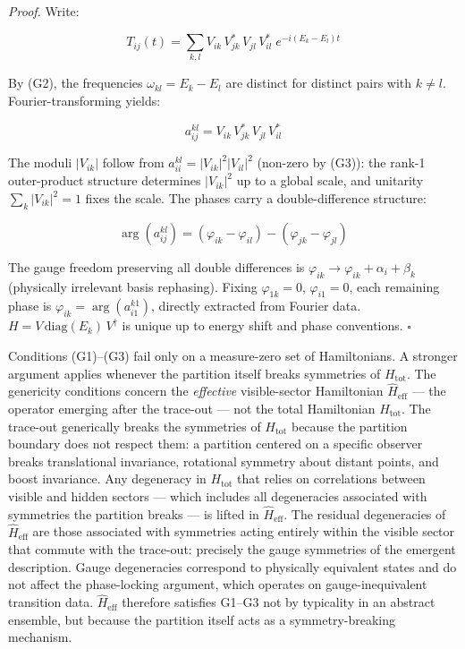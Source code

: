 \documentclass[
]{article}
\begin{document}
\emph{Proof.} Write:

\[T_{ij}(t) = \sum_{k,l} V_{ik}\, V_{jk}^*\, V_{jl}\, V_{il}^*\; e^{-i(E_k - E_l)t}\]

By (G2), the frequencies \(\omega_{kl} = E_k - E_l\) are distinct for
distinct pairs with \(k \neq l\). Fourier-transforming yields:

\[a_{ij}^{kl} = V_{ik}\, V_{jk}^*\, V_{jl}\, V_{il}^*\]

The moduli \(|V_{ik}|\) follow from
\(a_{ii}^{kl} = |V_{ik}|^2 |V_{il}|^2\) (non-zero by (G3)): the rank-1
outer-product structure determines \(|V_{ik}|^2\) up to a global scale,
and unitarity \(\sum_k |V_{ik}|^2 = 1\) fixes the scale. The phases
carry a double-difference structure:

\[\arg(a_{ij}^{kl}) = (\varphi_{ik} - \varphi_{il}) - (\varphi_{jk} - \varphi_{jl})\]

The gauge freedom preserving all double differences is
\(\varphi_{ik} \to \varphi_{ik} + \alpha_i + \beta_k\) (physically
irrelevant basis rephasing). Fixing \(\varphi_{1k} = 0\),
\(\varphi_{i1} = 0\), each remaining phase is
\(\varphi_{ik} = \arg(a_{i1}^{k1})\), directly extracted from Fourier
data. \(H = V \, \text{diag}(E_k) \, V^\dagger\) is unique up to energy
shift and phase conventions. \(\square\)

Conditions (G1)--(G3) fail only on a measure-zero set of Hamiltonians. A
stronger argument applies whenever the partition itself breaks
symmetries of \(H_{\text{tot}}\). The genericity conditions concern the
\emph{effective} visible-sector Hamiltonian \(\hat{H}_{\text{eff}}\) ---
the operator emerging after the trace-out --- not the total Hamiltonian
\(H_{\text{tot}}\). The trace-out generically breaks the symmetries of
\(H_{\text{tot}}\) because the partition boundary does not respect them:
a partition centered on a specific observer breaks translational
invariance, rotational symmetry about distant points, and boost
invariance. Any degeneracy in \(H_{\text{tot}}\) that relies on
correlations between visible and hidden sectors --- which includes all
degeneracies associated with symmetries the partition breaks --- is
lifted in \(\hat{H}_{\text{eff}}\). The residual degeneracies of
\(\hat{H}_{\text{eff}}\) are those associated with symmetries acting
entirely within the visible sector that commute with the trace-out:
precisely the gauge symmetries of the emergent description. Gauge
degeneracies correspond to physically equivalent states and do not
affect the phase-locking argument, which operates on gauge-inequivalent
transition data. \(\hat{H}_{\text{eff}}\) therefore satisfies G1--G3 not
by typicality in an abstract ensemble, but because the partition itself
acts as a symmetry-breaking mechanism.
\end{document}
